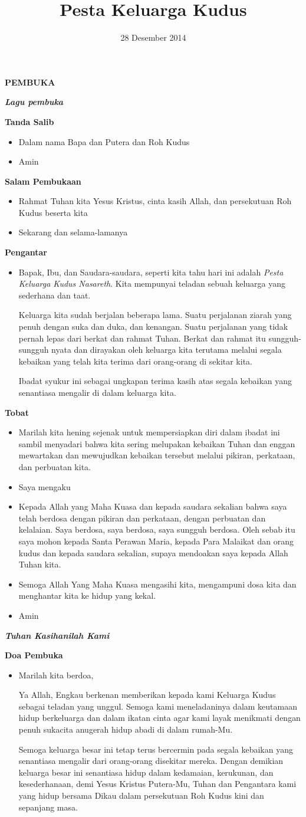 \documentclass[a5paper,12pt,openany]{scrbook}
\title{Pesta Keluarga Kudus}
\date{28 Desember 2014}
\makeatletter
\newcommand{\judul}[1]{%
  {\parindent \z@ \centering \normalfont
    \interlinepenalty\@M \Large \bfseries #1\par\nobreak \vskip 20\p@ }}
\newcommand{\subjudul}[1]{%
  {\parindent \z@ \normalfont
    \interlinepenalty\@M \bfseries #1\par\nobreak \vskip 20\p@ }}
\newcommand{\lagu}[1]{%
  {\parindent \z@ \normalfont
    \interlinepenalty\@M \bfseries \emph{#1}\par\nobreak \vskip 20\p@ }}
\newcommand{\BU}[1]{\begin{itemize} \item[U:] #1 \end{itemize}}
\newcommand{\BI}[1]{\begin{itemize} \item[P:] #1 \end{itemize}}
\makeatother
\begin{document}
\maketitle
\judul{PEMBUKA}

\lagu{Lagu pembuka}

\subjudul{Tanda Salib}
\BI{Dalam nama Bapa dan Putera dan Roh Kudus}
\BU{Amin}

\subjudul{Salam Pembukaan}
\BI{Rahmat Tuhan kita Yesus Kristus, cinta kasih Allah, dan persekutuan Roh Kudus beserta kita}
\BU{Sekarang dan selama-lamanya}

\subjudul{Pengantar}
\BI{Bapak, Ibu, dan Saudara-saudara, seperti kita tahu hari ini adalah \textit{Pesta Keluarga Kudus Nasareth}. Kita mempunyai teladan sebuah keluarga yang sederhana dan taat.

Keluarga kita sudah berjalan beberapa lama. Suatu perjalanan ziarah yang penuh dengan suka dan duka, dan kenangan. Suatu perjalanan yang tidak pernah lepas dari berkat dan rahmat Tuhan. Berkat dan rahmat itu sungguh-sungguh nyata dan dirayakan oleh keluarga kita terutama melalui segala kebaikan yang telah kita terima dari orang-orang di sekitar kita.

Ibadat syukur ini sebagai ungkapan terima kasih atas segala kebaikan yang senantiasa mengalir di dalam keluarga kita.}

\subjudul{Tobat}
\BI{Marilah kita hening sejenak untuk mempersiapkan diri dalam ibadat ini sambil menyadari bahwa kita sering melupakan kebaikan Tuhan dan enggan mewartakan dan mewujudkan kebaikan tersebut melalui pikiran, perkataan, dan perbuatan kita.}

\BI{Saya mengaku}

\BU{Kepada Allah yang Maha Kuasa dan kepada saudara sekalian bahwa saya telah berdosa dengan pikiran dan perkataan, dengan perbuatan dan kelalaian. Saya berdosa, saya berdosa, saya sungguh berdosa. Oleh sebab itu saya mohon kepada Santa Perawan Maria, kepada Para Malaikat dan orang kudus dan kepada saudara sekalian, supaya mendoakan saya kepada Allah Tuhan kita.}

\BI{Semoga Allah Yang Maha Kuasa mengasihi kita, mengampuni dosa kita dan menghantar kita ke hidup yang kekal.}

\BU{Amin}

\lagu{Tuhan Kasihanilah Kami}

\subjudul{Doa Pembuka}

\BI{Marilah kita berdoa,

Ya Allah, Engkau berkenan memberikan kepada kami Keluarga Kudus sebagai teladan yang unggul. Semoga kami meneladaninya dalam keutamaan hidup berkeluarga dan dalam ikatan cinta agar kami layak menikmati dengan penuh sukacita anugerah hidup abadi di dalam rumah-Mu.

Semoga keluarga besar ini tetap terus bercermin pada segala kebaikan yang senantiasa mengalir dari orang-orang disekitar mereka. Dengan demikian keluarga besar ini senantiasa hidup dalam kedamaian, kerukunan, dan kesederhanaan, demi Yesus Kristus Putera-Mu, Tuhan dan Pengantara kami yang hidup bersama Dikau dalam persekutuan Roh Kudus kini dan sepanjang masa.}
\end{document}

